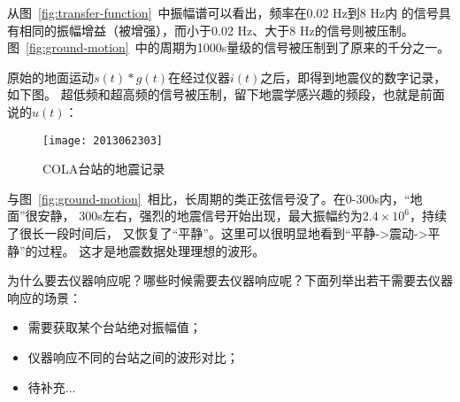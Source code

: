 从图~\ref{fig:transfer-function}~中振幅谱可以看出，频率在0.02 Hz到8 Hz内
的信号具有相同的振幅增益（被增强），而小于0.02 Hz、大于8 Hz的信号则被压制。
图~\ref{fig:ground-motion}~中的周期为1000s量级的信号被压制到了原来的千分之一。

原始的地面运动$s(t)*g(t)$在经过仪器$i(t)$之后，即得到地震仪的数字记录，如下图。
超低频和超高频的信号被压制，留下地震学感兴趣的频段，也就是前面说的$u(t)$：

\begin{figure}[H]
\centering
\texttt{[image: 2013062303]}
\caption{COLA台站的地震记录}
\end{figure}

与图~\ref{fig:ground-motion}~相比，长周期的类正弦信号没了。在0-300s内，“地面”很安静，
300s左右，强烈的地震信号开始出现，最大振幅约为$2.4\times10^6$，持续了很长一段时间后，
又恢复了“平静”。这里可以很明显地看到“平静->震动->平静”的过程。
这才是地震数据处理理想的波形。

为什么要去仪器响应呢？哪些时候需要去仪器响应呢？下面列举出若干需要去仪器响应的场景：

\begin{itemize}
\item 需要获取某个台站绝对振幅值；
\item 仪器响应不同的台站之间的波形对比；
\item 待补充...
\end{itemize}

